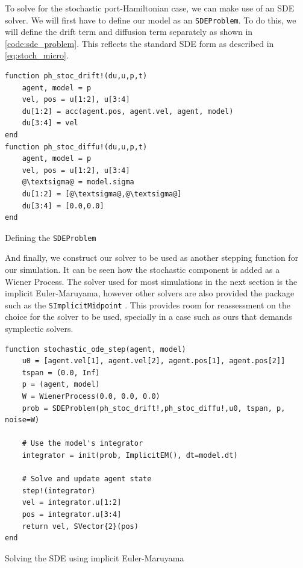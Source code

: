 To solve for the stochastic port-Hamiltonian case, we can make use of an SDE solver. We will first have to define our model as an \texttt{SDEProblem}. To do this, we will define the drift term and diffusion term separately as shown in \autoref{code:sde_problem}. This reflects the standard SDE form as described in \autoref{eq:stoch_micro}.

\begin{listing}[H]
    \begin{verbatim}        
function ph_stoc_drift!(du,u,p,t)
    agent, model = p
    vel, pos = u[1:2], u[3:4]
    du[1:2] = acc(agent.pos, agent.vel, agent, model)
    du[3:4] = vel
end
function ph_stoc_diffu!(du,u,p,t)
    agent, model = p
    vel, pos = u[1:2], u[3:4]
    @\textsigma@ = model.sigma
    du[1:2] = [@\textsigma@,@\textsigma@] 
    du[3:4] = [0.0,0.0]
end
\end{verbatim}
\caption{Defining the \texttt{SDEProblem}}
\label{code:sde_problem}
\end{listing}

And finally, we construct our solver to be used as another stepping function for our simulation. It can be seen how the stochastic component is added as a Wiener Process. The solver used for most simulations in the next section is the implicit Euler-Maruyama, however other solvers are also provided the package such as the \texttt{SImplicitMidpoint} \cite{rackauckas2017differentialequations}. This provides room for reassessment on the choice for the solver to be used, specially in a case such as ours that demands symplectic solvers.
\begin{listing}[H]
    \begin{verbatim}        
function stochastic_ode_step(agent, model)
    u0 = [agent.vel[1], agent.vel[2], agent.pos[1], agent.pos[2]]
    tspan = (0.0, Inf)
    p = (agent, model)
    W = WienerProcess(0.0, 0.0, 0.0)
    prob = SDEProblem(ph_stoc_drift!,ph_stoc_diffu!,u0, tspan, p, noise=W)
    
    # Use the model's integrator
    integrator = init(prob, ImplicitEM(), dt=model.dt)
    
    # Solve and update agent state
    step!(integrator)
    vel = integrator.u[1:2]
    pos = integrator.u[3:4]
    return vel, SVector{2}(pos)
end
\end{verbatim}
\caption{Solving the SDE using implicit Euler-Maruyama}
\label{code:sde_solve}
\end{listing}

